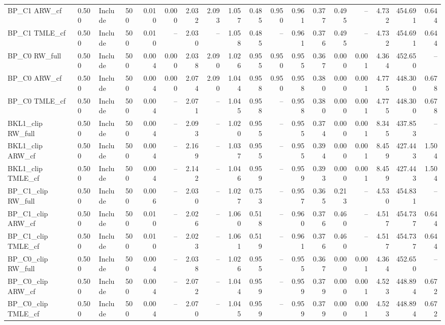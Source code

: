 \begin{tabular}{llllrrrrrrrrrrrrrr}
BP\_C1 ARW\_cf & 0.500 & Include & 500 & 0.010 & 0.000 & 2.032 & 2.093 & 1.057 & 0.485 & 0.950 & 0.961 & 0.377 & 0.495 & -- & 4.732 & 454.691 & 0.644 \\
BP\_C1 TMLE\_cf & 0.500 & Include & 500 & 0.010 & -- & 2.030 & -- & 1.058 & 0.485 & -- & 0.961 & 0.376 & 0.495 & -- & 4.732 & 454.691 & 0.644 \\
BP\_C0 RW\_full & 0.500 & Include & 500 & 0.004 & 0.000 & 2.038 & 2.090 & 1.026 & 0.955 & 0.950 & 0.955 & 0.367 & 0.000 & 0.001 & 4.364 & 452.650 & -- \\
BP\_C0 ARW\_cf & 0.500 & Include & 500 & 0.004 & 0.000 & 2.074 & 2.090 & 1.044 & 0.958 & 0.950 & 0.958 & 0.380 & 0.000 & 0.001 & 4.775 & 448.300 & 0.678 \\
BP\_C0 TMLE\_cf & 0.500 & Include & 500 & 0.004 & -- & 2.071 & -- & 1.045 & 0.958 & -- & 0.958 & 0.380 & 0.000 & 0.001 & 4.775 & 448.300 & 0.678 \\
BKL1\_clip RW\_full & 0.500 & Include & 500 & 0.004 & -- & 2.093 & -- & 1.020 & 0.955 & -- & 0.955 & 0.374 & 0.000 & 0.001 & 8.345 & 437.853 & -- \\
BKL1\_clip ARW\_cf & 0.500 & Include & 500 & 0.004 & -- & 2.169 & -- & 1.037 & 0.955 & -- & 0.955 & 0.394 & 0.000 & 0.001 & 8.459 & 427.443 & 1.504 \\
BKL1\_clip TMLE\_cf & 0.500 & Include & 500 & 0.004 & -- & 2.142 & -- & 1.046 & 0.959 & -- & 0.959 & 0.393 & 0.000 & 0.001 & 8.459 & 427.443 & 1.504 \\
BP\_C1\_clip RW\_full & 0.500 & Include & 500 & 0.006 & -- & 2.030 & -- & 1.027 & 0.753 & -- & 0.957 & 0.365 & 0.213 & -- & 4.530 & 454.831 & -- \\
BP\_C1\_clip ARW\_cf & 0.500 & Include & 500 & 0.010 & -- & 2.026 & -- & 1.060 & 0.518 & -- & 0.960 & 0.376 & 0.460 & -- & 4.517 & 454.737 & 0.644 \\
BP\_C1\_clip TMLE\_cf & 0.500 & Include & 500 & 0.010 & -- & 2.023 & -- & 1.061 & 0.519 & -- & 0.961 & 0.376 & 0.460 & -- & 4.517 & 454.737 & 0.644 \\
BP\_C0\_clip RW\_full & 0.500 & Include & 500 & 0.004 & -- & 2.038 & -- & 1.026 & 0.955 & -- & 0.955 & 0.367 & 0.000 & 0.001 & 4.364 & 452.650 & -- \\
BP\_C0\_clip ARW\_cf & 0.500 & Include & 500 & 0.004 & -- & 2.072 & -- & 1.044 & 0.959 & -- & 0.959 & 0.379 & 0.000 & 0.001 & 4.523 & 448.894 & 0.672 \\
BP\_C0\_clip TMLE\_cf & 0.500 & Include & 500 & 0.004 & -- & 2.070 & -- & 1.045 & 0.959 & -- & 0.959 & 0.379 & 0.000 & 0.001 & 4.523 & 448.894 & 0.672 \\

\end{tabular}
